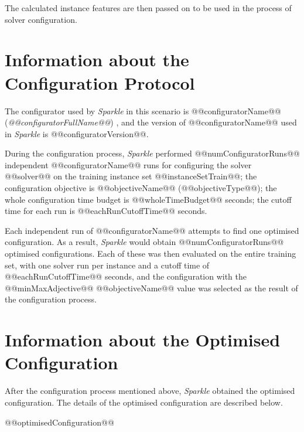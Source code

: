\documentclass[british]{article}
\newif\iffeatures
\begin{document}
        The calculated instance features are then passed on to be used in the process of solver configuration. 

\fi


\section{Information about the Configuration Protocol}

The configurator used by \emph{Sparkle} in this scenario is @@configuratorName@@ ({\em @@configuratorFullName@@}) \cite{@@configuratorName@@}, and the version of @@configuratorName@@ used in \emph{Sparkle} is @@configuratorVersion@@.

During the configuration process, \emph{Sparkle} performed @@numConfiguratorRuns@@ independent @@configuratorName@@ runs for configuring the solver @@solver@@ on the training instance set @@instanceSetTrain@@\iffeatures; the instance features of the training instance set were used for configuration\fi; the configuration objective is @@objectiveName@@ (@@objectiveType@@); the whole configuration time budget is @@wholeTimeBudget@@ seconds; the cutoff time for each run is @@eachRunCutoffTime@@ seconds.

Each independent run of @@configuratorName@@ attempts to find one optimised configuration. As a result, \emph{Sparkle} would obtain @@numConfiguratorRuns@@ optimised configurations. Each of these was then evaluated on the entire training set, with one solver run per instance and a cutoff time of @@eachRunCutoffTime@@ seconds, and the configuration with the @@minMaxAdjective@@ @@objectiveName@@ value was selected as the result of the configuration process.

\section{Information about the Optimised Configuration}

After the configuration process mentioned above, \emph{Sparkle} obtained the optimised configuration. The details of the optimised configuration are described below.

\vspace{5mm}

\begin{enumerate}
@@optimisedConfiguration@@
\end{enumerate}

\vspace{5mm}
\end{document}
